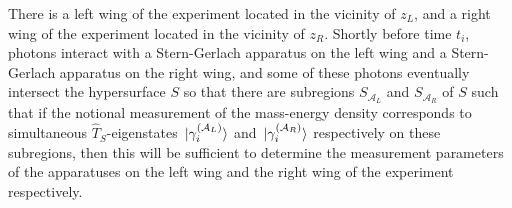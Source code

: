 There is a left wing of the experiment located in the vicinity of $z_L$, and a right wing of the experiment located in the vicinity of $z_R$. Shortly before time $t_i$, photons interact with a Stern-Gerlach apparatus on the left wing and a Stern-Gerlach apparatus on the right wing, and some of these photons eventually intersect the hypersurface $S$ so that there are subregions $S_{\mathcal{A}_L}$ and $S_{\mathcal{A}_R}$ %
%
 of $S$ such that if the notional measurement of the mass-energy density corresponds to simultaneous $\hat{T}_S$-eigenstates $\ket*{\gamma_i^{(\mathcal{A}_L)}}$ and $\ket*{\gamma_i^{(\mathcal{A}_R)}}$ %
  respectively on these subregions, then this will be sufficient to determine the measurement parameters of the apparatuses on the left wing and the right wing of the experiment respectively. 

